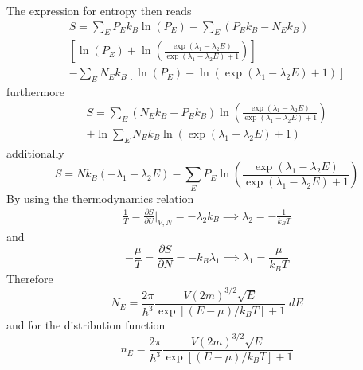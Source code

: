 \documentclass[../../../Main.tex]{subfiles}
\begin{document}
The expression for entropy then reads
\begin{multline*}
    S=\sum_E  P_Ek_B\ln (P_E) -
    \sum_E  (P_Ek_B-N_Ek_B)\\\left[\ln (P_E)+\ln \left(\frac{ \exp(\lambda_1 - \lambda_2E)}{\exp(\lambda_1 -\lambda_2E) +1}\right)\right]\\
    -\sum_E N_E k_B\left[\ln (P_E)-\ln (\exp(\lambda_1 -\lambda_2E) +1)\right]
\end{multline*}
furthermore
\begin{multline*}
    S=\sum_E  (N_Ek_B- P_Ek_B)\ln \left(\frac{ \exp(\lambda_1 - \lambda_2E)}{\exp(\lambda_1 -\lambda_2E) +1}\right) \\
    +\ln \sum_E  N_Ek_B \ln \left(\exp(\lambda_1 -\lambda_2E) +1\right)
\end{multline*}
additionally
\begin{equation*}
    S=Nk_B(-\lambda_1-\lambda_2E)-\sum_E P_E\ln \left(\frac{ \exp(\lambda_1 - \lambda_2E)}{\exp(\lambda_1 -\lambda_2E) +1}\right)
\end{equation*}
By using the thermodynamics relation
\begin{align*}
    \frac{1}{T}=\frac{\partial S}{\partial U}\bigg|_{V,N}=-\lambda_2k_B\implies
    \lambda_2=-\frac{1}{k_BT}
\end{align*}
and 
\begin{equation*}
    -\frac{\mu}{T}=\frac{\partial S}{\partial N}=-k_B\lambda_1 \implies \lambda_1=\frac{\mu}{k_B T}
\end{equation*}
Therefore 
\begin{equation*}
    N_E=\frac{2\pi}{h^3} \frac{V (2m)^{3/2}\sqrt{E}}{\exp\left[(E-\mu)/k_BT\right]+1} \;dE
\end{equation*}
and for the distribution function
\begin{equation*}
    n_E=\frac{2\pi}{h^3} \frac{V (2m)^{3/2}\sqrt{E}}{\exp\left[(E-\mu)/k_BT\right]+1}
\end{equation*}
\end{document}
